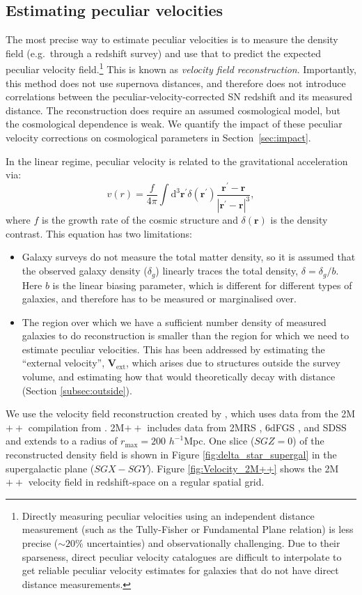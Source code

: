 \documentclass[
  journal=pasa,
  manuscript=research-paper,
  year=2022,
]{cup-journal}
\newcommand{\Vext}{\ensuremath{\bm{V}_{\text{ext}}}}
\newcommand{\hMpc}{$h^{-1}$Mpc}
\begin{document}
\subsection{Estimating peculiar velocities}\label{subsec:newPVs}
The most precise way to estimate peculiar velocities is to measure the density field (e.g.\ through a redshift survey) and use that to predict the expected peculiar velocity field.\footnote{Directly measuring peculiar velocities using an independent distance measurement (such as the Tully-Fisher or Fundamental Plane relation) is less precise ($\sim20$\% uncertainties) and observationally challenging. 
Due to their sparseness, direct peculiar velocity catalogues are difficult to interpolate to get reliable peculiar velocity estimates for galaxies that do not have direct distance measurements.} 
This is known as {\em velocity field reconstruction}. 
Importantly, this method does not use supernova distances, and therefore does not introduce correlations between the peculiar-velocity-corrected SN redshift and its measured distance.
The reconstruction does require an assumed cosmological model, but the cosmological dependence is weak.  
We quantify the impact of these peculiar velocity corrections on cosmological parameters in Section~\ref{sec:impact}.

In the linear regime, peculiar velocity is related to the gravitational acceleration via:
\begin{equation}
    v(r) = \frac{f}{4\pi}\int \mathrm{d}^3\bm{r}^\prime \delta(\bm{r}^\prime) \frac{\bm{r}^\prime-\bm{r}}{|\bm{r}^\prime-\bm{r}|^3},
\label{v-d}
\end{equation}
where $f$ is the growth rate of the cosmic structure and $\delta(\bm{r})$ is the density contrast.
This equation has two limitations:
\begin{itemize}
    \item Galaxy surveys do not measure the total matter density, so it is assumed that the observed galaxy density ($\delta_g$) linearly traces the total density, $\delta = \delta_g/b$.  Here $b$ is the linear biasing parameter, which is different for different types of galaxies, and therefore has to be measured or marginalised over. 
    \item The region over which we have a sufficient number density of measured galaxies to do reconstruction is smaller than the region for which we need to estimate peculiar velocities.  This has been addressed by estimating the ``external velocity'', \Vext{}, which arises due to structures outside the survey volume, and estimating how that would theoretically decay with distance (Section \ref{subsec:outside}).
\end{itemize}
We use the velocity field reconstruction created by \cite{Carrick2015}, which uses data from the 2M$++$ compilation from \citet{Lavaux_and_Hudson2011}.  
2M$++$ includes data from 2MRS \citep{Huchra2005}, 6dFGS \citep{Jones2009}, and SDSS \citep{Abazajian2009} and extends to a radius of $r_{\text{max}}=200$ \hMpc{}.
One slice ($SGZ=0$) of the reconstructed density field is shown in Figure \ref{fig:delta_star_supergal} in the supergalactic plane ($SGX-SGY$).
Figure \ref{fig:Velocity_2M++} shows the 2M$++$ velocity field in redshift-space on a regular spatial grid.
\end{document}
